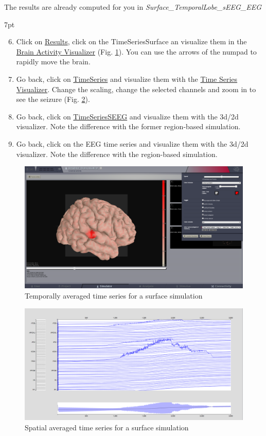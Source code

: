 \documentclass{tufte-handout}
\newenvironment{simulation}{%
  \def\FrameCommand{%
    \hspace{1pt}%
    {\color{ForestGreen}\vrule width 2pt}%
    {\color{simulationshade}\vrule width 4pt}%
    \colorbox{simulationshade}%
  }%
  \MakeFramed{\advance\hsize-\width\FrameRestore}%
  \noindent\hspace{-4.55pt}%
  \begin{adjustwidth}{}{7pt}%
  \vspace{2pt}\vspace{2pt}%
}
{%
  \vspace{2pt}\end{adjustwidth}\endMakeFramed%
}
\begin{document}
  The results are already computed for you in \textit{Surface\_TemporalLobe\_sEEG\_EEG}
 \begin{simulation}
  \begin{enumerate}
     \setcounter{enumi}{5}
  \item Click on \underline{Results}, click on the TimeSeriesSurface an visualize them in the 
  \underline{Brain Activity Visualizer} (Fig. \ref{fig:bv_surf}). You can use the arrows of the numpad to rapidly 
  move the brain.
  \item Go back,  click on \underline{TimeSeries} and visualize them with the \underline{Time Series Visualizer}. Change the scaling, change the selected channels and zoom in to see
  the seizure (Fig. \ref{fig:ts_surf}).
  \item Go back, click on \underline{TimeSeriesSEEG} and visualize them with the 3d/2d visualizer.
  Note the difference with the former region-based simulation.
  \item Go back, click on the EEG time series and visualize them with the 3d/2d visualizer.
  Note the difference with the region-based simulation.
\end{enumerate}
\end{simulation}

\begin{figure}[h]
  \includegraphics[width=\linewidth]{Handout_UI_ModellingAnEpilepticPatient_TemporalAverageTimeSeriesSurface}%
  \caption{Temporally averaged time series for a surface simulation}%
  \label{fig:bv_surf}%
\end{figure}

\begin{figure}[h]
  \includegraphics[width=\linewidth]{Handout_UI_ModellingEpilepsy_SpatialAverageTimeSeries}%
  \caption{Spatial averaged time series for a surface simulation}%
  \label{fig:ts_surf}%
\end{figure}
\end{document}
